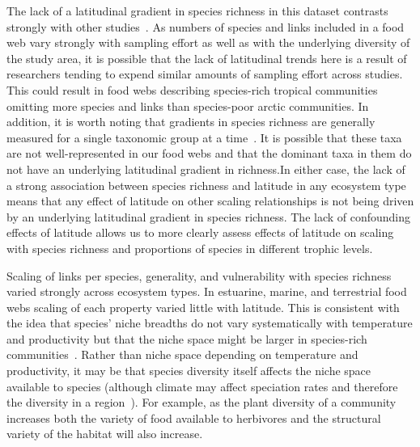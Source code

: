 \documentclass[12pt]{article}
\begin{document}
  The lack of a latitudinal gradient in species richness in this dataset
  contrasts strongly with other
  studies~\citep{Kaufman1995,Macpherson2002,Hillebrand2004,Schemske2009}. As
  numbers of species and links included in a food web vary strongly with
  sampling effort as well as with the underlying diversity of the study area,
  it is possible that the lack of latitudinal trends here is a result of
  researchers tending to expend similar amounts of sampling effort across
  studies. This could result in food webs describing species-rich tropical
  communities omitting more species and links than species-poor arctic
  communities. In addition, it is worth noting that gradients in species
  richness are generally measured for a single taxonomic group at a
  time~\citep{Kaufman1995,Macpherson2002,Hillebrand2004,Schemske2009}. It is possible
  that these taxa are not well-represented in our food webs and that the
  dominant taxa in them do not have an underlying latitudinal gradient in
  richness.In either case, the lack of a strong association between species
  richness and latitude in any ecosystem type means that any effect of
  latitude on other scaling relationships is not being driven by an underlying
  latitudinal gradient in species richness. The lack of confounding effects of
  latitude allows us to more clearly assess effects of latitude on scaling
  with species richness and proportions of species in different trophic
  levels.


  Scaling of links per species, generality, and vulnerability with species
  richness varied strongly across ecosystem types. In estuarine, marine, and
  terrestrial food webs scaling of each property varied little with latitude.
  This is consistent with the idea that species' niche breadths do not vary
  systematically with temperature and productivity but that the niche space
  might be larger in species-rich communities~\citep{Davies2007}. Rather than
  niche space depending on temperature and productivity, it may be that species
  diversity itself affects the niche space available to species (although climate
  may affect speciation rates and therefore the diversity in a region~\citep{Currie2004}). 
  For example, as the plant diversity of a community increases both the 
  variety of food available to herbivores and the structural variety of the habitat will also increase.
\end{document}
